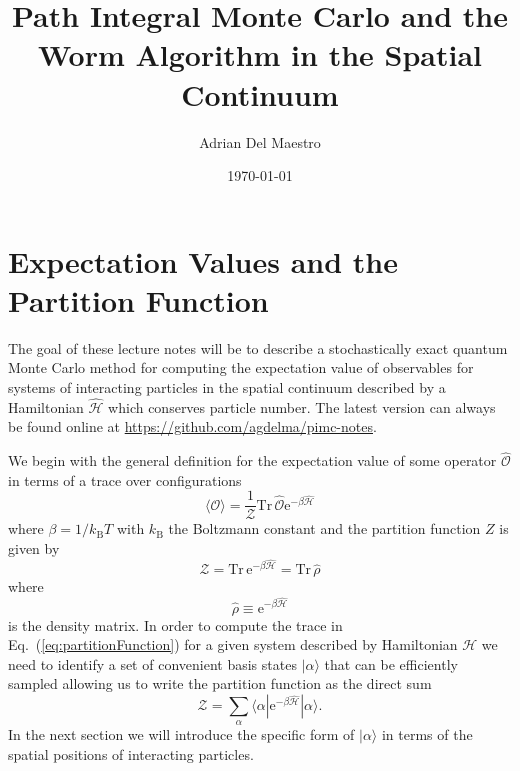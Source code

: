\documentclass[prb,aps,amssym,nofootinbib,floatfix,notitlepage]{revtex4-1}
\newcommand{\e}[1]{\mathrm{e}^{#1}}
\renewcommand{\eqref}[1]{Eq.~(\ref{#1})}
\begin{document}
\title{Path Integral Monte Carlo and the Worm Algorithm in the Spatial
Continuum}
\author{Adrian Del Maestro}

\date{\today}
\maketitle

\section{Expectation Values and the Partition Function}

The goal of these lecture notes will be to describe a stochastically exact
quantum Monte Carlo method for computing the expectation value of observables
for systems of interacting particles in the spatial continuum described by a
Hamiltonian $\hat{\mathcal{H}}$ which conserves particle number.  The latest
version can always be found online at
\url{https://github.com/agdelma/pimc-notes}.

We begin with the general definition for the expectation value of some operator
$\hat{\mathcal{O}}$ in terms of a trace over configurations
%
\begin{equation}
    \langle \mathcal{O} \rangle = \frac{1}{\mathcal{Z}} \mathrm{Tr}\, 
    \hat{\mathcal{O}}\e{-\beta \hat{\mathcal{H}}} 
\label{eq:operatorExpectationValue}
\end{equation}
%
where $\beta = 1/k_{\mathrm{B}}T$ with $k_{\mathrm{B}}$ the Boltzmann constant
and the partition function $Z$ is given by
%
\begin{equation}
    \mathcal{Z} = \mathrm{Tr}\,\e{-\beta \hat{\mathcal{H}}} 
    = \mathrm{Tr}\,\hat{\rho} 
\label{eq:partitionFunction} 
\end{equation}
%
where 
%
\begin{equation}
\hat{\rho} \equiv \e{-\beta \hat{\mathcal{H}}} 
\end{equation}
%
is the density matrix.  In order to compute the trace in
\eqref{eq:partitionFunction} for a given system described by Hamiltonian
$\mathcal{H}$ we need to identify a set of convenient basis states
$|\alpha\rangle$ that can be efficiently sampled allowing us to write the
partition function as the direct sum 
%
\begin{equation}
    \mathcal{Z} =  \sum_{\alpha}\langle \alpha | \e{-\beta \hat{\mathcal{H}}}
    |\alpha \rangle.
\end{equation}
%
In the next section we will introduce the specific form of $|\alpha\rangle$
in terms of the spatial positions of interacting particles.
\end{document}
